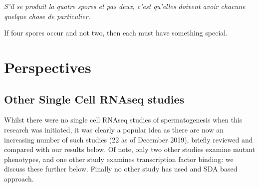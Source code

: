 \begin{savequote}[8cm]
\textit{S'il se produit la quatre spores et pas deux, c'est qu'elles doivent avoir chacune quelque chose de particulier.}

If four spores occur and not two, then each must have something special.
\end{savequote}

\chapter{\label{ch:4-discuss}Perspectives}

\minitoc


\section{Other Single Cell RNAseq studies}
Whilst there were no single cell RNAseq studies of spermatogenesis when this research was initiated, it was clearly a popular idea as there are now an increasing number of such studies (22 as of December 2019), briefly reviewed and compared with our results below.
Of note, only two other studies examine mutant phenotypes, and one other study examines transcription factor binding: we discuss these further below.
Finally no other study has used and SDA based approach.



